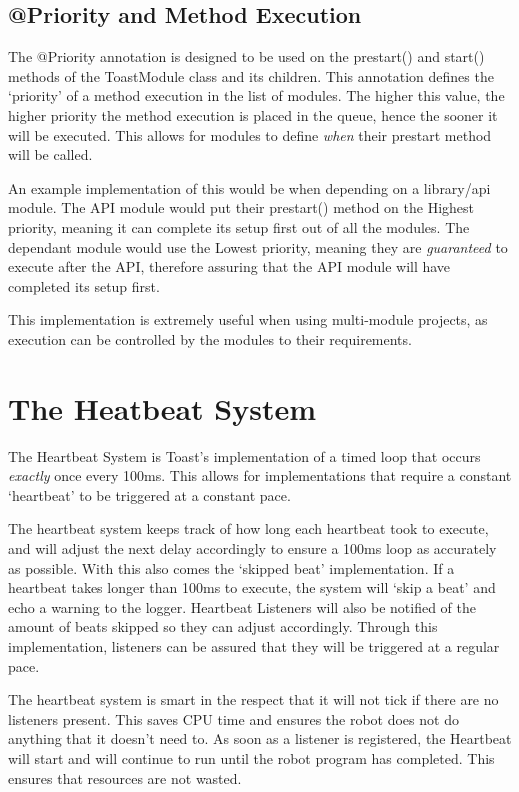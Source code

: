 \documentclass[a4paper,12pt]{article}
\begin{document}
\subsection{@Priority and Method Execution}
The @Priority annotation is designed to be used on the prestart() and start() methods of the ToastModule class and its children. This annotation defines the `priority' of a method execution in the list of modules. The higher this value, the higher priority the method execution is placed in the queue, hence the sooner it will be executed. This allows for modules to define \textit{when} their prestart method will be called.

An example implementation of this would be when depending on a library/api module. The API module would put their prestart() method on the Highest priority, meaning it can complete its setup first out of all the modules. The dependant module would use the Lowest priority, meaning they are \textit{guaranteed} to execute after the API, therefore assuring that the API module will have completed its setup first.

This implementation is extremely useful when using multi-module projects, as execution can be controlled by the modules to their requirements. 

\newpage

\section{The Heatbeat System}
The Heartbeat System is Toast's implementation of a timed loop that occurs \textit{exactly} once every 100ms. This allows for implementations that require a constant `heartbeat' to be triggered at a constant pace.

The heartbeat system keeps track of how long each heartbeat took to execute, and will adjust the next delay accordingly to ensure a 100ms loop as accurately as possible. With this also comes the `skipped beat' implementation. If a heartbeat takes longer than 100ms to execute, the system will `skip a beat' and echo a warning to the logger. Heartbeat Listeners will also be notified of the amount of beats skipped so they can adjust accordingly. Through this implementation, listeners can be assured that they will be triggered at a regular pace.

The heartbeat system is smart in the respect that it will not tick if there are no listeners present. This saves CPU time and ensures the robot does not do anything that it doesn't need to. As soon as a listener is registered, the Heartbeat will start and will continue to run until the robot program has completed. This ensures that resources are not wasted. 
\end{document}
